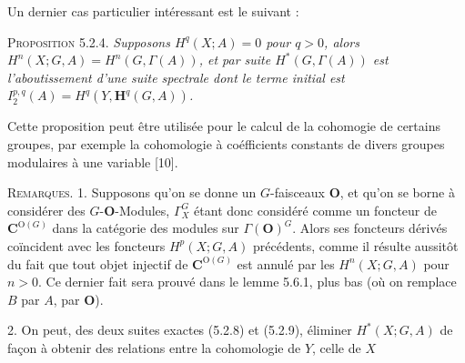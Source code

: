 Un dernier cas particulier intéressant est le suivant :

\textsc{Proposition 5.2.4.} \textit{Supposons $H^q(X;A)=0$ pour
$q>0$, alors $H^n(X;G,A)=H^n(G,\Gamma(A))$, et par suite
$H^*(G,\Gamma(A))$ est l'aboutissement d'une suite spectrale dont le terme
initial est $I_2^{p,q}(A)=H^q(Y,\mathbf H^q(G,A))$.}

Cette proposition peut être utilisée pour le calcul de la cohomogie de
certains groupes, par exemple la cohomologie à coéfficients constants de
divers groupes modulaires à une variable [10].

\textsc{Remarques. 1.} Supposons qu'on se donne un $G$-faisceaux
${\mathbf O}$, et qu'on se borne à considérer des $G$-${\mathbf O}$-Modules, $\Gamma_X^G$ étant
donc considéré comme un foncteur de ${\mathbf C}^{\mathrm O(G)}$ dans la catégorie des modules
sur $\Gamma({\mathbf O})^G$. Alors ses foncteurs dérivés coïncident avec les foncteurs
$H^p(X;G,A)$ précédents, comme il résulte aussitôt du fait que tout objet
injectif de ${\mathbf C}^{\mathrm O(G)}$ est annulé par les $H^n(X;G,A)$ pour $n>0$. Ce dernier
fait sera prouvé dans le lemme 5.6.1, plus bas (où on remplace $B$ par $A$,
par ${\mathbf O}$).

2. On peut, des deux suites exactes (5.2.8) et (5.2.9), éliminer
$H^*(X;G,A)$ de façon à obtenir des relations entre la cohomologie de $Y$,
celle de $X$

